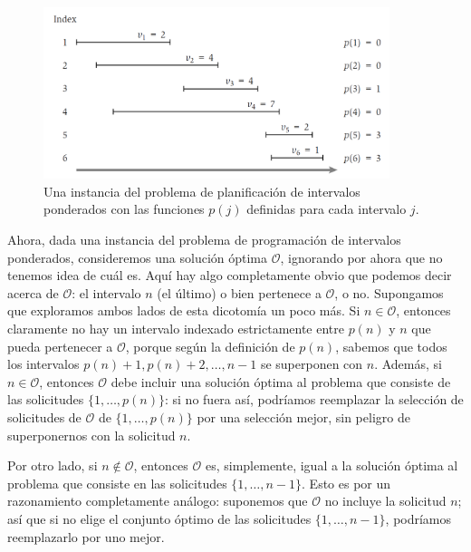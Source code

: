 \documentclass[a4paper, 12pt]{book}
\theoremstyle{dotless}
\begin{document}
\begin{figure}[h]
\centering
\includegraphics[width=0.9\textwidth]{Imagenes-Seccion6/fig6_2.PNG}
\caption{Una instancia del problema de planificación de intervalos ponderados con las funciones $p(j)$ definidas para cada intervalo $j$.}
\label{fig:Imagenes-Seccion6/fig6_2.PNG}
\end{figure}

Ahora, dada una instancia del problema de programación de intervalos ponderados, consideremos una solución óptima $\mathcal{O}$, ignorando por ahora que no tenemos idea de cuál es. Aquí hay algo completamente obvio que podemos decir acerca de $\mathcal{O}$: el intervalo $n$ (el último) o bien pertenece a $\mathcal{O}$, o no. 
Supongamos que exploramos ambos lados de esta dicotomía un poco más. Si $n \in \mathcal{O}$, entonces claramente no hay un intervalo indexado estrictamente entre $p(n)$ y $n$ que pueda pertenecer a $\mathcal{O}$, porque según la definición de $p(n)$, sabemos que todos los intervalos $p(n)+1,p(n)+2,\dots,n-1$ se superponen con $n$.
Además, si $n \in \mathcal{O}$, entonces $\mathcal{O}$ debe incluir una solución óptima al problema que consiste de las solicitudes $\{1,\dots, p(n)\}$: si no fuera así, podríamos reemplazar la selección de solicitudes de $\mathcal{O}$ de $\{1,\dots,p(n)\}$ por una selección mejor, sin peligro de superponernos con la solicitud $n$.

Por otro lado, si $n\notin \mathcal{O}$, entonces $\mathcal{O}$ es, simplemente, igual a la solución óptima al problema que consiste en las solicitudes $\{1,\dots,n-1\}$. Esto es por un razonamiento completamente análogo: suponemos que $\mathcal{O}$ no incluye la solicitud $n$; así que si no elige el conjunto óptimo de las solicitudes $\{1,\dots,n-1\}$, podríamos reemplazarlo por uno mejor.
\end{document}
